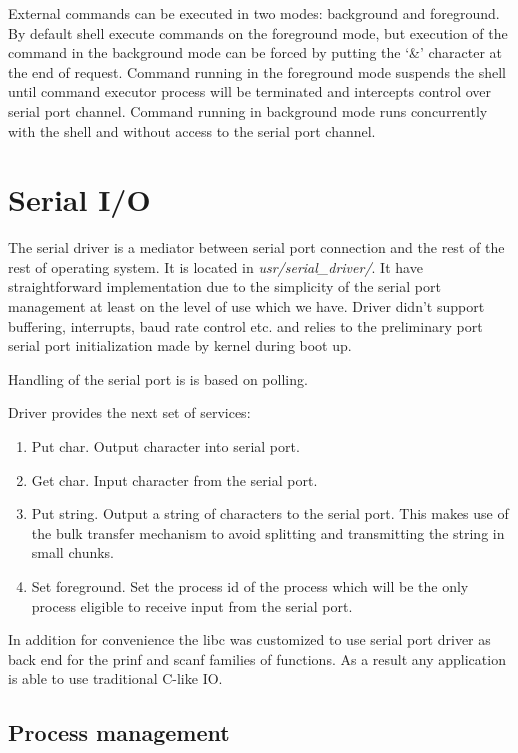 \documentclass[a4paper,10pt]{article}
\newcommand{\filepath}[1]{\emph{ #1}}
\begin{document}
	External commands can be executed in two modes: background and foreground.
	By default shell execute commands on the foreground mode, but execution of the command in the background mode can be forced by putting the `\&' character at the end of request.
	Command running in the foreground mode suspends the shell until command executor process will be terminated and intercepts control over serial port channel.
	Command running in background mode runs concurrently with the shell and without access to the serial port channel.
    	    	
	 \section{Serial I/O}
	 	The serial driver is a mediator between serial port connection and the rest of the rest of operating system. It is located in \filepath{usr/serial\_driver/}.
	 	It have straightforward implementation due to the simplicity of the serial port management at least on the level of use which we have.
	 	Driver didn't support buffering, interrupts, baud rate control etc. and relies to the preliminary port serial port initialization made by kernel during boot up.
	 	
	 	Handling of the serial port is is based on polling.
		
		Driver provides the next set of services:
		\begin{enumerate}
			\item Put char. Output character into serial port.
			\item Get char. Input character from the serial port.
			\item Put string. Output a string of characters to the serial port. This makes use of the bulk transfer mechanism to avoid splitting and transmitting the string in small chunks.
			\item Set foreground. Set the process id of the process which will be the only process eligible to receive input from the serial port.
		\end{enumerate}
		
		In addition for convenience the libc was customized to use serial port driver as back end for the prinf and scanf families of functions.
		As a result any application is able to use traditional C-like IO.

\subsection{Process management}
\label{sec:process-management}
\end{document}
